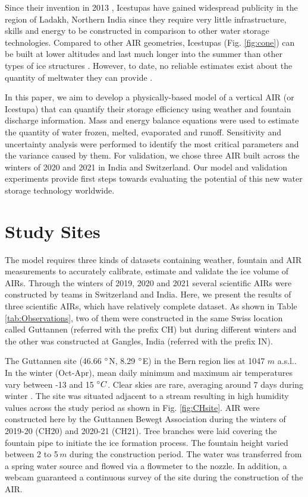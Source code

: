 \documentclass[utf8]{frontiersSCNS} %
\begin{document}
Since their invention in 2013 \citep{campaign}, Icestupas have gained widespread publicity in the region of Ladakh, Northern India since they require very little infrastructure, skills and energy to be constructed in comparison to other water storage technologies. Compared to other AIR geometries, Icestupas (Fig. \ref{fig:cone}) can be built at lower altitudes and last much longer into the summer than other types of ice structures \citep{campaign}. However, to date, no reliable estimates exist about the quantity of meltwater they can provide \citep{Nusser_2018}.

In this paper, we aim to develop a physically-based model of a vertical AIR (or Icestupa) that can quantify their
storage efficiency using weather and fountain discharge information. Mass and energy balance equations were used to estimate the quantity of water frozen, melted, evaporated and runoff. Sensitivity and uncertainty analysis were
performed to identify the most critical parameters and the variance caused by them. For validation, we chose three AIR built across the winters of 2020 and 2021 in India and Switzerland. Our model and validation experiments provide first steps towards evaluating the potential of this new water storage technology worldwide.

\section{Study Sites}
The model requires three kinds of datasets containing weather, fountain and AIR measurements to accurately calibrate, estimate and validate the ice volume of AIRs. Through the winters of 2019, 2020 and 2021 several scientific AIRs were constructed by teams in Switzerland and India. Here, we present the results of three scientific AIRs, which have relatively complete dataset. As shown in Table \ref{tab:Observations}, two of them were constructed in the same Swiss location called Guttannen (referred with the prefix CH) but during different winters and the other was constructed at Gangles, India (referred with the prefix IN).

The Guttannen site (46.66 $\degree$N, 8.29 $\degree$E) in the Bern region lies at 1047 $m$ a.s.l.. In the winter (Oct-Apr), mean daily minimum and maximum air temperatures vary between -13 and 15 $\degree C$. Clear skies are rare, averaging around 7 days during winter \citep{eispalast}. The site was situated adjacent to a stream resulting in high humidity values across the study period as shown in Fig. \ref{fig:CHsite}. AIR were constructed here by the Guttannen Bewegt Association during the winters of 2019-20 (CH20) and 2020-21 (CH21). Tree branches were laid covering the fountain pipe to initiate the ice formation process. The fountain height varied between 2 to 5\,$m$ during the construction period. The water was transferred from a spring water source and flowed via a flowmeter to the nozzle. In addition, a webcam guaranteed a continuous survey of the site during the construction of the AIR.
\end{document}
